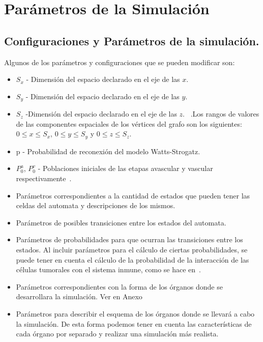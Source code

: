 \chapter{Par\'ametros de la Simulaci\'on}\label{chapter:proposal}



\section{Configuraciones y Par\'ametros de la simulaci\'on.}

Algunos de los par\'ametros y configuraciones que se pueden modificar son:
\begin{itemize}
    \item $S_{x}$ - Dimensi\'on del espacio declarado en el eje de las $x$.
    \item $S_{y}$ - Dimensi\'on del espacio declarado en el eje de las $y$.
    \item $S_{z}$ -Dimensi\'on del espacio declarado en el eje de las $z$. ~\cite{7}.Los rangos de valores de las componentes espaciales de los vértices del grafo son los siguientes: $0 \leq x \leq S_{x}$, $0 \leq y \leq S_{y}$ y $0 \leq z \leq S_{z}$.
    \item p - Probabilidad de reconexi\'on del modelo Watts-Strogatz.
    \item $P_0^a$, $P_0^v$ - Poblaciones iniciales de las etapas avascular y vascular respectivamente~\cite{7}.
    \item Par\'ametros correspondientes a la cantidad de estados que pueden tener las celdas del automata y descripciones de los mismos.
    \item Par\'ametros de posibles transiciones entre los estados del automata.
    \item Par\'ametros de probabilidades para que ocurran las transiciones entre los estados. Al incluir par\'ametros para el c\'alculo de ciertas probabilidades, se puede tener en cuenta el c\'alculo de la probabilidad de la interacci\'on de las c\'elulas tumorales con el sistema inmune, como se hace en~\cite{6}.
    \item Par\'ametros correspondientes con la forma de los \'organos donde se desarrollara la simulaci\'on. Ver en Anexo %
    \item Par\'ametros para describir el esquema de los \'organos donde se llevar\'a a cabo la simulaci\'on. De esta forma podemos tener en cuenta las caracter\'isticas de cada \'organo por separado y realizar una simulaci\'on m\'as realista.
\end{itemize}

